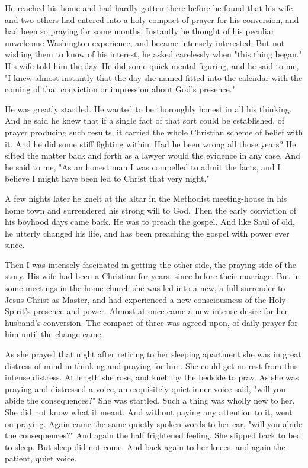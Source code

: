 He reached his home and had hardly gotten there before he found that his
wife and two others had entered into a holy compact of prayer for his
conversion, and had been so praying for some months. Instantly he thought
of his peculiar unwelcome Washington experience, and became intensely
interested. But not wishing them to know of his interest, he asked
carelessly when "this thing began." His wife told him the day. He did some
quick mental figuring, and he said to me, "I knew almost instantly that
the day she named fitted into the calendar with the coming of that
conviction or impression about God's presence."

He was greatly startled. He wanted to be thoroughly honest in all his
thinking. And he said he knew that if a single fact of that sort could be
established, of prayer producing such results, it carried the whole
Christian scheme of belief with it. And he did some stiff fighting within.
Had he been wrong all those years? He sifted the matter back and forth as
a lawyer would the evidence in any case. And he said to me, "As an honest
man I was compelled to admit the facts, and I believe I might have been
led to Christ that very night."

A few nights later he knelt at the altar in the Methodist meeting-house in
his home town and surrendered his strong will to God. Then the early
conviction of his boyhood days came back. He was to preach the gospel. And
like Saul of old, he utterly changed his life, and has been preaching the
gospel with power ever since.

Then I was intensely fascinated in getting the other side, the
praying-side of the story. His wife had been a Christian for years, since
before their marriage. But in some meetings in the home church she was
led into a new, a full surrender to Jesus Christ as Master, and had
experienced a new consciousness of the Holy Spirit's presence and power.
Almost at once came a new intense desire for her husband's conversion. The
compact of three was agreed upon, of daily prayer for him until the change
came.

As she prayed that night after retiring to her sleeping apartment she was
in great distress of mind in thinking and praying for him. She could get
no rest from this intense distress. At length she rose, and knelt by the
bedside to pray. As she was praying and distressed a voice, an exquisitely
quiet inner voice said, "will you abide the consequences?" She was
startled. Such a thing was wholly new to her. She did not know what it
meant. And without paying any attention to it, went on praying. Again came
the same quietly spoken words to her ear, "will you abide the
consequences?" And again the half frightened feeling. She slipped back to
bed to sleep. But sleep did not come. And back again to her knees, and
again the patient, quiet voice.

